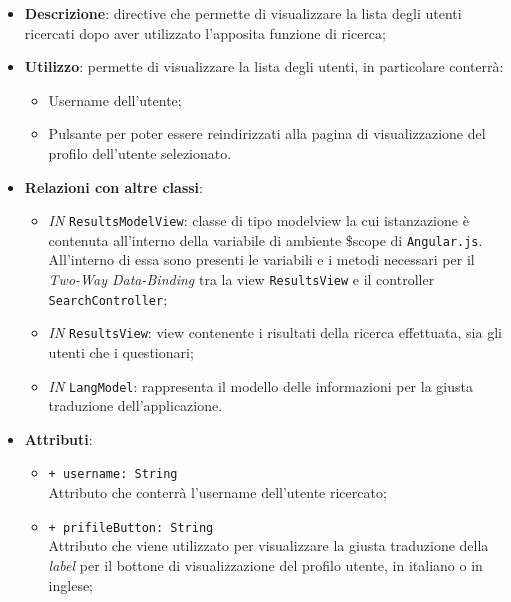 \begin{itemize}
	\item \textbf{Descrizione}: directive che permette di visualizzare la lista degli utenti ricercati dopo aver utilizzato l'apposita funzione di ricerca;
	\item \textbf{Utilizzo}: permette di visualizzare la lista degli utenti, in particolare conterrà:
	\begin{itemize}
		\item Username dell'utente;
		\item Pulsante per poter essere reindirizzati alla pagina di visualizzazione del profilo dell'utente selezionato.
	\end{itemize}
	\item \textbf{Relazioni con altre classi}:
	\begin{itemize}
		\item \textit{IN} \texttt{ResultsModelView}: classe di tipo modelview la cui istanzazione è contenuta all'interno della variabile di ambiente \$scope di \texttt{Angular.js}. All'interno di essa sono presenti le variabili e i metodi necessari per il \textit{Two-Way Data-Binding} tra la view \texttt{ResultsView} e il controller \texttt{SearchController};
		\item \textit{IN} \texttt{ResultsView}: view contenente i risultati della ricerca effettuata, sia gli utenti che i questionari;
		\item \textit{IN} \texttt{LangModel}: rappresenta il modello delle informazioni per la giusta traduzione dell'applicazione.
	\end{itemize}
	\item \textbf{Attributi}:
	\begin{itemize}
		\item \texttt{+ username: String} \\ Attributo che conterrà l'username dell'utente ricercato;
		\item \texttt{+ prifileButton: String} \\ Attributo che viene utilizzato per visualizzare la giusta traduzione della \textit{label} per il bottone di visualizzazione del profilo utente, in italiano o in inglese;
	\end{itemize}
\end{itemize}
